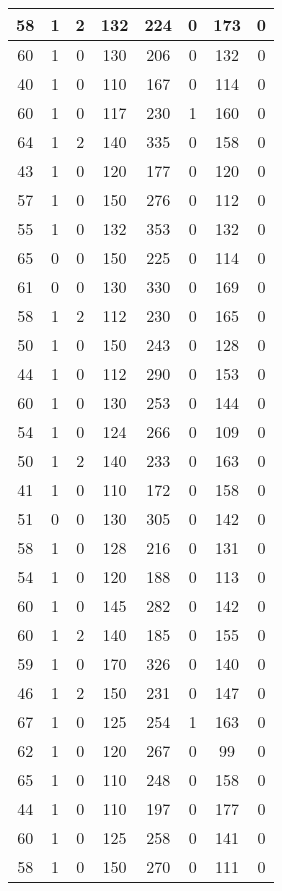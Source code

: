 \documentclass{article}
\begin{document}
\begin{longtable}{|c|c|c|c|c|c|c|c|}
58 & 1 & 2 & 132 & 224 & 0 & 173 & 0 \\ \hline
60 & 1 & 0 & 130 & 206 & 0 & 132 & 0 \\ \hline
40 & 1 & 0 & 110 & 167 & 0 & 114 & 0 \\ \hline
60 & 1 & 0 & 117 & 230 & 1 & 160 & 0 \\ \hline
64 & 1 & 2 & 140 & 335 & 0 & 158 & 0 \\ \hline
43 & 1 & 0 & 120 & 177 & 0 & 120 & 0 \\ \hline
57 & 1 & 0 & 150 & 276 & 0 & 112 & 0 \\ \hline
55 & 1 & 0 & 132 & 353 & 0 & 132 & 0 \\ \hline
65 & 0 & 0 & 150 & 225 & 0 & 114 & 0 \\ \hline
61 & 0 & 0 & 130 & 330 & 0 & 169 & 0 \\ \hline
58 & 1 & 2 & 112 & 230 & 0 & 165 & 0 \\ \hline
50 & 1 & 0 & 150 & 243 & 0 & 128 & 0 \\ \hline
44 & 1 & 0 & 112 & 290 & 0 & 153 & 0 \\ \hline
60 & 1 & 0 & 130 & 253 & 0 & 144 & 0 \\ \hline
54 & 1 & 0 & 124 & 266 & 0 & 109 & 0 \\ \hline
50 & 1 & 2 & 140 & 233 & 0 & 163 & 0 \\ \hline
41 & 1 & 0 & 110 & 172 & 0 & 158 & 0 \\ \hline
51 & 0 & 0 & 130 & 305 & 0 & 142 & 0 \\ \hline
58 & 1 & 0 & 128 & 216 & 0 & 131 & 0 \\ \hline
54 & 1 & 0 & 120 & 188 & 0 & 113 & 0 \\ \hline
60 & 1 & 0 & 145 & 282 & 0 & 142 & 0 \\ \hline
60 & 1 & 2 & 140 & 185 & 0 & 155 & 0 \\ \hline
59 & 1 & 0 & 170 & 326 & 0 & 140 & 0 \\ \hline
46 & 1 & 2 & 150 & 231 & 0 & 147 & 0 \\ \hline
67 & 1 & 0 & 125 & 254 & 1 & 163 & 0 \\ \hline
62 & 1 & 0 & 120 & 267 & 0 & 99 & 0 \\ \hline
65 & 1 & 0 & 110 & 248 & 0 & 158 & 0 \\ \hline
44 & 1 & 0 & 110 & 197 & 0 & 177 & 0 \\ \hline
60 & 1 & 0 & 125 & 258 & 0 & 141 & 0 \\ \hline
58 & 1 & 0 & 150 & 270 & 0 & 111 & 0 \\ \hline

\end{longtable}
\end{document}
